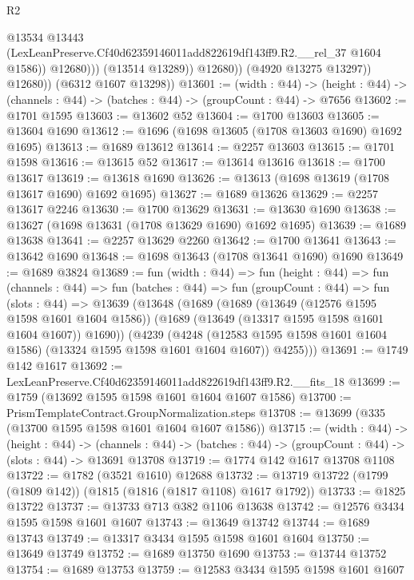 \begin{lexlean}{R2}
\begin{coremodule}
                          @13534
                          @13443
                          (LexLeanPreserve.Cf40d62359146011add822619df143ff9.R2.__rel_37
                            @1604
                            @1586))
                        @12680)))
                  (@13514 @13289))
                @12680))
            (@4920 @13275 @13297))
          @12680))
      (@6312 @1607 @13298))
@13601 := (width : @44) ->
  (height : @44) -> (channels : @44) -> (batches : @44) -> (groupCount : @44) -> @7656
@13602 := @1701 @1595
@13603 := @13602 @52
@13604 := @1700 @13603
@13605 := @13604 @1690
@13612 := @1696 (@1698 @13605 (@1708 @13603 @1690) @1692 @1695)
@13613 := @1689 @13612
@13614 := @2257 @13603
@13615 := @1701 @1598
@13616 := @13615 @52
@13617 := @13614 @13616
@13618 := @1700 @13617
@13619 := @13618 @1690
@13626 := @13613 (@1698 @13619 (@1708 @13617 @1690) @1692 @1695)
@13627 := @1689 @13626
@13629 := @2257 @13617 @2246
@13630 := @1700 @13629
@13631 := @13630 @1690
@13638 := @13627 (@1698 @13631 (@1708 @13629 @1690) @1692 @1695)
@13639 := @1689 @13638
@13641 := @2257 @13629 @2260
@13642 := @1700 @13641
@13643 := @13642 @1690
@13648 := @1698 @13643 (@1708 @13641 @1690) @1690
@13649 := @1689 @3824
@13689 := fun (width : @44) =>
  fun (height : @44) =>
  fun (channels : @44) =>
  fun (batches : @44) =>
  fun (groupCount : @44) =>
  fun (slots : @44) =>
  @13639
    (@13648
      (@1689
        (@1689
          (@13649 (@12576 @1595 @1598 @1601 @1604 @1586))
          (@1689 (@13649 (@13317 @1595 @1598 @1601 @1604 @1607)) @1690))
        (@4239
          (@4248 (@12583 @1595 @1598 @1601 @1604 @1586) (@13324 @1595 @1598 @1601 @1604 @1607))
          @4255)))
@13691 := @1749 @142 @1617
@13692 := LexLeanPreserve.Cf40d62359146011add822619df143ff9.R2.__fits_18
@13699 := @1759 (@13692 @1595 @1598 @1601 @1604 @1607 @1586)
@13700 := PrismTemplateContract.GroupNormalization.steps
@13708 := @13699 (@335 (@13700 @1595 @1598 @1601 @1604 @1607 @1586))
@13715 := (width : @44) ->
  (height : @44) ->
  (channels : @44) -> (batches : @44) -> (groupCount : @44) -> (slots : @44) -> @13691 @13708
@13719 := @1774 @142 @1617 @13708 @1108
@13722 := @1782 (@3521 @1610) @12688
@13732 := @13719 @13722 (@1799 (@1809 @142)) (@1815 (@1816 (@1817 @1108) @1617 @1792))
@13733 := @1825 @13722
@13737 := @13733 @713 @382 @1106 @13638
@13742 := @12576 @3434 @1595 @1598 @1601 @1607
@13743 := @13649 @13742
@13744 := @1689 @13743
@13749 := @13317 @3434 @1595 @1598 @1601 @1604
@13750 := @13649 @13749
@13752 := @1689 @13750 @1690
@13753 := @13744 @13752
@13754 := @1689 @13753
@13759 := @12583 @3434 @1595 @1598 @1601 @1607

\end{coremodule}
\end{lexlean}
